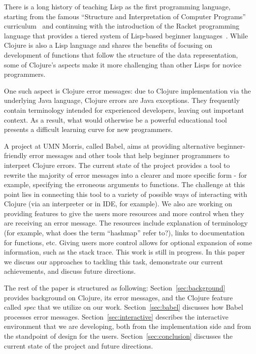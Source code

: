 \documentclass[12pt]{article}
\newcommand{\comment}[1]{{\bf \tt  {#1}}}
\newcommand{\emcomment}[1]{\textcolor{ForestGreen}{\comment{Elena: {#1}}}}
\begin{document}
There is a long history of teaching Lisp as the first programming language, starting from the famous  ``Structure and Interpretation of Computer Programs'' curriculum~\cite{Abelson} and continuing with the introduction of the 
Racket programming language that provides a tiered system of Lisp-based beginner languages~\cite{Felleisen:2004,racket}. While Clojure is also a Lisp language and shares the benefits of focusing on development of functions that follow the structure of the data representation, some of Clojure's aspects make it more challenging than other Lisps for novice programmers. 

One such aspect is Clojure error messages: due to Clojure implementation via the underlying Java language, 
Clojure errors are Java exceptions. 
They frequently contain terminology intended for experienced developers, leaving out important context. 
As a result, what would otherwise be a powerful educational tool presents a difficult learning curve for new programmers.

A project at UMN Morris, called Babel, aims at providing alternative beginner-friendly error messages and other tools that help beginner programmers to interpret Clojure errors. 
The current state of the project provides a tool to rewrite the majority of error messages into a clearer and more specific form - for example, specifying the erroneous arguments to functions. 
The challenge at this point lies in connecting this tool to a variety of possible ways of interacting with Clojure (via an interpreter or in IDE, for example). 
We also are working on providing features to give the users more resources and more control when they are receiving an error message. The resources include explanation of terminology (for example, what does the term ``hashmap'' refer to?), links to documentation for functions, etc. Giving users more control allows for optional expansion of some information, such as the stack trace. 
This work is still in progress. 
In this paper we discuss our approaches to tackling this task, demonstrate our current achievements, and discuss future directions. 

The rest of the paper is structured as following:
Section~\ref{sec:background} provides background on Clojure, its error messages, and the Clojure feature called {\it spec} that we utilize on our work. Section~\ref{sec:babel} discusses how Babel processes error messages. 
Section~\ref{sec:interactive} describes the interactive environment that we are developing, both from the implementation side and from the standpoint of design for the users. 
Section~\ref{sec:conclusion} discusses the current state of the project and future directions.  
\end{document}
